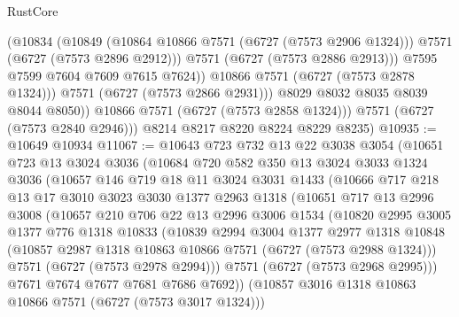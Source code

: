 \begin{lexlean}{RustCore}
\begin{coremodule}
                      (@10834
                        (@10849
                          (@10864 @10866 @7571 (@6727 (@7573 @2906 @1324)))
                          @7571
                          (@6727 (@7573 @2896 @2912)))
                        @7571
                        (@6727 (@7573 @2886 @2913)))
                      @7595
                      @7599
                      @7604
                      @7609
                      @7615
                      @7624))
                  @10866
                  @7571
                  (@6727 (@7573 @2878 @1324)))
                @7571
                (@6727 (@7573 @2866 @2931)))
              @8029
              @8032
              @8035
              @8039
              @8044
              @8050))
          @10866
          @7571
          (@6727 (@7573 @2858 @1324)))
        @7571
        (@6727 (@7573 @2840 @2946)))
      @8214
      @8217
      @8220
      @8224
      @8229
      @8235)
@10935 := @10649 @10934
@11067 := @10643
    @723
    @732
    @13
    @22
    @3038
    @3054
    (@10651
      @723
      @13
      @3024
      @3036
      (@10684
        @720
        @582
        @350
        @13
        @3024
        @3033
        @1324
        @3036
        (@10657
          @146
          @719
          @18
          @11
          @3024
          @3031
          @1433
          (@10666
            @717
            @218
            @13
            @17
            @3010
            @3023
            @3030
            @1377
            @2963
            @1318
            (@10651
              @717
              @13
              @2996
              @3008
              (@10657
                @210
                @706
                @22
                @13
                @2996
                @3006
                @1534
                (@10820
                  @2995
                  @3005
                  @1377
                  @776
                  @1318
                  @10833
                  (@10839
                    @2994
                    @3004
                    @1377
                    @2977
                    @1318
                    @10848
                    (@10857 @2987 @1318 @10863 @10866 @7571 (@6727 (@7573 @2988 @1324)))
                    @7571
                    (@6727 (@7573 @2978 @2994)))
                  @7571
                  (@6727 (@7573 @2968 @2995)))
                @7671
                @7674
                @7677
                @7681
                @7686
                @7692))
            (@10857 @3016 @1318 @10863 @10866 @7571 (@6727 (@7573 @3017 @1324)))

\end{coremodule}
\end{lexlean}
